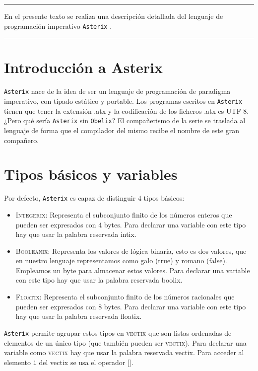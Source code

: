 \documentclass[a4paper, 10pt]{article}
\newcommand{\atx}{\texttt{Asterix} }
\begin{document}
    \begin{small}
        \hrule
        \vspace{\baselineskip}
        En el presente texto se realiza una descripción detallada del lenguaje
        de programación imperativo \atx. 
        \vspace{\baselineskip}\hrule
    \end{small}

    \section*{Introducción a Asterix}
    \atx nace de la idea de ser un lenguaje de programación de paradigma 
    imperativo, con tipado estático y portable. Los programas escritos en \atx tienen que
    tener la extensión .atx y la codificación de los ficheros .atx es UTF-8.
    ¿Pero qué sería \atx sin \texttt{Obelix}? El compañerismo de la serie 
    se traslada al lenguaje de forma que el compilador del mismo recibe el
    nombre de este gran compañero. 

    \section*{Tipos básicos y variables}
    Por defecto, \atx es capaz de distinguir 4 tipos básicos:
    \begin{itemize}
        \item \textsc{Integerix}: Representa el subconjunto finito de los números
            enteros que pueden ser expresados con 4 bytes. Para declarar una
            variable con este tipo hay que usar la palabra reservada \textsf{intix}.
        \item \textsc{Booleanix}: Representa los valores de lógica binaria, esto
            es dos valores, que en nuestro lenguaje representamos como
            \textsf{galo} (true) y \textsf{romano} (false). Empleamos un byte
            para almacenar estos valores. Para declarar una variable con este
            tipo hay que usar la palabra reservada \textsf{boolix}.
        \item \textsc{Floatix}: Representa el subconjunto finito de los números
            racionales que pueden ser expresados con 8 bytes. Para declarar una
            variable con este tipo hay que usar la palabra reservada \textsf{floatix}.
    \end{itemize}

    \atx permite agrupar estos tipos en \textsc{vectix} que son listas ordenadas
    de elementos de un único tipo (que también pueden ser \textsc{vectix}).
    Para declarar una variable como \textsc{vectix} hay que usar la palabra 
    reservada \textsf{vectix}. Para acceder al elemento \texttt{i} del vectix
    se usa el operador [].
\end{document}
